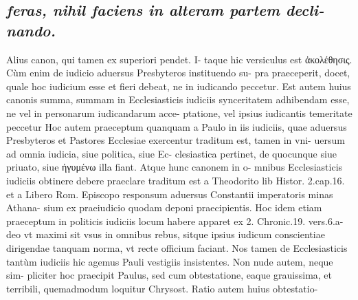 \documentclass{article}
\begin{document}
\begin{pages}
\subsection*{\textit{feras, nihil faciens in alteram partem decli- nando. }}\pstart Alius canon, qui tamen ex superiori pendet. I- taque hic versiculus est ἀκολέθησις. Cùm enim de iudicio aduersus Presbyteros instituendo su- pra praeceperit, docet, quale hoc iudicium esse et fieri debeat, ne in iudicando peccetur.  \pend\pstart Est autem huius canonis summa, summam in Ecclesiasticis iudiciis synceritatem adhibendam esse, ne vel in personarum iudicandarum acce- ptatione, vel ipsius iudicantis temeritate peccetur Hoc autem praeceptum quanquam a Paulo in iis iudiciis, quae aduersus Presbyteros et Pastores Ecclesiae exercentur traditum est, tamen in vni- uersum ad omnia iudicia, siue politica, siue Ec- clesiastica pertinet, de quocunque siue priuato, siue ἠγυμένω illa fiant. Atque hunc canonem in o- mnibus Ecclesiasticis iudiciis obtinere debere praeclare traditum est a Theodorito lib Histor. 2.cap.16. et a Libero Rom. Episcopo responsum aduersus Constantii imperatoris minas Athana- sium ex praeiudicio quodam deponi praecipientis. Hoc idem etiam praeceptum in politicis iudiciis locum habere apparet ex 2. Chronic.19. vers.6.a- deo vt maximi sit vsus in omnibus rebus, sitque ipsius iudicum conscientiae dirigendae tanquam norma, vt recte officium faciant. Nos tamen de Ecclesiasticis tantùm iudiciis hic agemus Pauli vestigiis insistentes. Non nude autem, neque sim- pliciter hoc praecipit Paulus, sed cum obtestatione, eaque grauissima, et terribili, quemadmodum loquitur Chrysost. Ratio autem huius obtestatio-  \pend

\end{pages}
\end{document}
